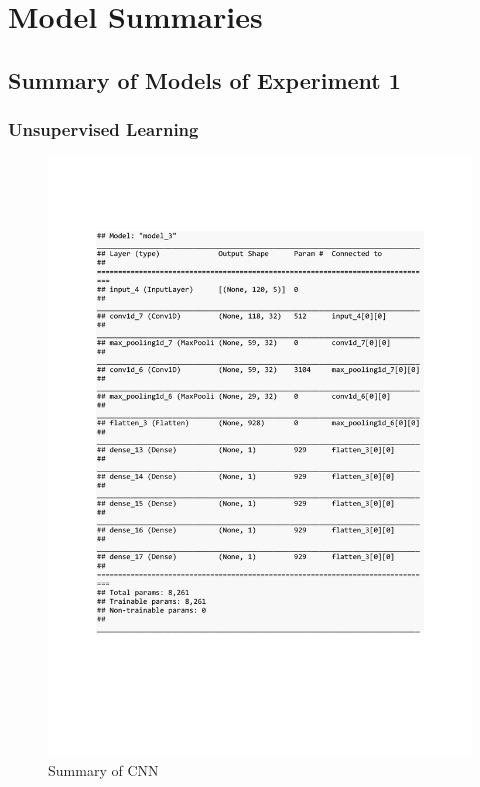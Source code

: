 
\chapter{Model Summaries} %

\label{AppendixA} %

\section{Summary of Models of Experiment 1}

\subsection{Unsupervised Learning}
\begin{figure}[h]
	\centering
	\includegraphics[scale=0.5]{Figures/summary_CNN_pred_syn}
	\decoRule
	\caption[Synthetic Anomalies]{Summary of CNN \parencite{own}}
	\label{fig:summary_CNN_pred_syn}
\end{figure}

